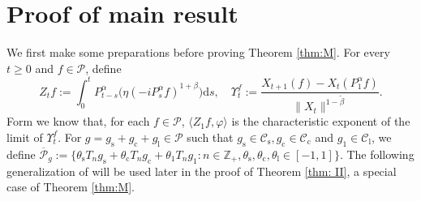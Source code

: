 \documentclass[12pt,a4paper]{amsart}
\theoremstyle{plain}
\theoremstyle{definition}
\numberwithin{equation}{section}
\begin{document}
\section{Proof of main result}
\label{proofs of main results}

We first make some preparations before proving Theorem \ref{thm:M}.
For every $t\geq 0$ and $f\in \mathcal P$, define
\[
  	Z_t f
  	:= \int_0^t P^\alpha_{t-s}\big( \eta (-i P^\alpha_sf)^{1+\beta}\big)\mathrm ds,\quad
  	\Upsilon^f_t
   := \frac{X_{t+1} (f) - X_t(P_1^\alpha f)}{\| X_t\|^{1-\tilde \beta}}.
\]
Form \cite[Theorem 3.4]{RenSongSunZhao2019Stable} we know that, for each $f\in \mathcal P$, $\langle Z_1f,\varphi\rangle$ is the characteristic exponent of the limit of $\Upsilon^f_t$.
For $g = g_\mathrm s + g_\mathrm c + g_\mathrm l\in \mathcal P$ such that $g_\mathrm s \in \mathcal C_\mathrm s, g_\mathrm c \in \mathcal C_\mathrm c$ and $g_\mathrm 1 \in \mathcal C_\mathrm l$, we define $\overline {\mathcal P}_g:= \{\theta_\mathrm s T_n g_\mathrm s +  \theta_\mathrm c T_n g_\mathrm c + \theta_\mathrm 1 T_n g_\mathrm 1: n \in \mathbb Z_+, \theta_\mathrm s, \theta_\mathrm c, \theta_\mathrm l \in [-1,1]\}$.
The following generalization of
\cite[Proposition 3.5]{RenSongSunZhao2019Stable} will be used later in the proof of  Theorem \ref{thm: II}, a special case of Theorem \ref{thm:M}.
\end{document}
